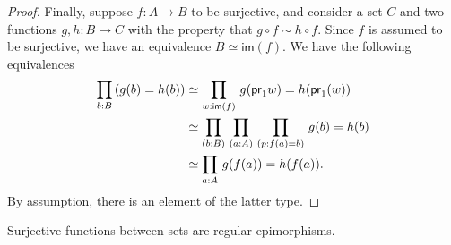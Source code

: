 \begin{proof}
Finally, suppose $f:A\to B$ to be surjective, and consider a set $C$ and two functions
$g,h:B\to C$ with the property that $g\circ f\sim h\circ f$. Since $f$ 
is assumed to be surjective,
we have an equivalence $B\simeq\mathsf{im}(f)$. We have the following equivalences
\begin{align*}
\prd{b:B} (g(b)= h(b))
& \simeq \prd{w:\mathsf{im}(f)} g(\proj1 w)= h(\proj1(w))\\
& \simeq \prd{b:B}{a:A}{p:f(a)= b} g(b)= h(b)\\
& \simeq \prd{a:A} g(f(a))= h(f(a)).
\end{align*}
By assumption, there is an element of the latter type.
\end{proof}


\begin{lem}\label{lem:images_are_coequalizers}
Surjective functions between sets are regular epimorphisms.
\end{lem}

